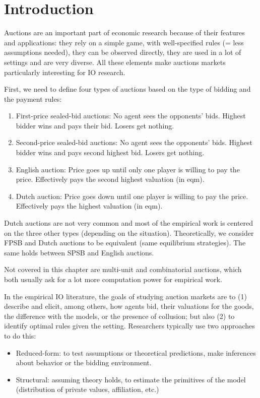 \section{Introduction}

Auctions are an important part of economic research because of their features and applications: they rely on a simple game, with well-specified rules (= less assumptions needed), they can be observed directly, they are used in a lot of settings and are very diverse. All these elements make auctions markets particularly interesting for IO research.

First, we need to define four types of auctions based on the type of bidding and the payment rules: \begin{enumerate}
\item First-price sealed-bid auctions: No agent sees the opponents' bids. Highest bidder wins and pays their bid. Losers get nothing.
\item Second-price sealed-bid auctions: No agent sees the opponents' bids. Highest bidder wins and pays second highest bid. Losers get nothing.
\item English auction: Price goes up until only one player is willing to pay the price. Effectively pays the second highest valuation (in eqm).
\item Dutch auction: Price goes down until one player is willing to pay the price. Effectively pays the highest valuation (in eqm).
\end{enumerate} 

Dutch auctions are not very common and most of the empirical work is centered on the three other types (depending on the situation). Theoretically, we consider FPSB and Dutch auctions to be equivalent (same equilibrium strategies). The same holds between SPSB and English auctions. 

Not covered in this chapter are multi-unit and combinatorial auctions, which both usually ask for a lot more computation power for empirical work.

In the empirical IO literature, the goals of studying auction markets are to (1) describe and elicit, among others, how agents bid, their valuations for the goods, the difference with the models, or the presence of collusion; but also (2) to identify optimal rules given the setting. Researchers typically use two approaches to do this:\begin{itemize}
\item Reduced-form: to test assumptions or theoretical predictions, make inferences about behavior or the bidding environment.
\item Structural: assuming theory holds, to estimate the primitives of the model (distribution of private values, affiliation, etc.)
\end{itemize}

